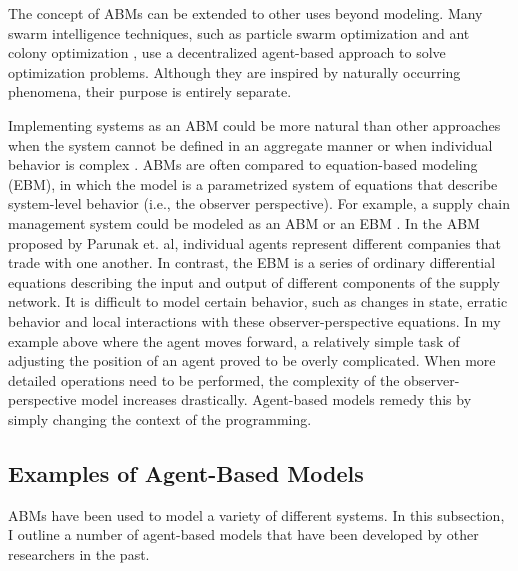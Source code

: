 The concept of ABMs can be extended to other uses beyond modeling.
Many swarm intelligence techniques, such as particle swarm optimization \cite{kennedy1995pso} and ant colony optimization \cite{dorigo2004aco}, use a decentralized agent-based approach to solve optimization problems.
Although they are inspired by naturally occurring phenomena, their purpose is entirely separate.

Implementing systems as an ABM could be more natural than other approaches when the system cannot be defined in an aggregate manner or when individual behavior is complex \cite{bonabeau2002agent}.
ABMs are often compared to equation-based modeling (EBM), in which the model is a parametrized system of equations that describe system-level behavior (i.e., the observer perspective).
For example, a supply chain management system could be modeled as an ABM or an EBM \cite{parunak1998agent}.
In the ABM proposed by Parunak et. al, individual agents represent different companies that trade with one another.
In contrast, the EBM is a series of ordinary differential equations describing the input and output of different components of the supply network.
It is difficult to model certain behavior, such as changes in state, erratic behavior and local interactions with these observer-perspective equations.
In my example above where the agent moves forward, a relatively simple task of adjusting the position of an agent proved to be overly complicated.
When more detailed operations need to be performed, the complexity of the observer-perspective model increases drastically.
Agent-based models remedy this by simply changing the context of the programming.




\subsection{Examples of Agent-Based Models}

ABMs have been used to model a variety of different systems.
In this subsection, I outline a number of agent-based models that have been developed by other researchers in the past.


